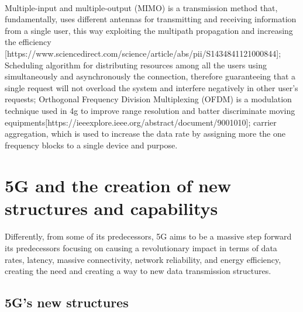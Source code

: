 \documentclass[10pt,journal,compsoc]{IEEEtran}
\begin{document}
\paragraph{}
Multiple-input and multiple-output (MIMO) is a transmission method that, fundamentally, uses different antennas for transmitting and receiving information from a single user, this way exploiting the multipath propagation and increasing the efficiency [https://www.sciencedirect.com/science/article/abs/pii/S1434841121000844]; Scheduling algorithm for distributing resources among all the users using simultaneously and asynchronously the connection, therefore guaranteeing that a single request will not overload the system and interfere negatively in other user's requests; Orthogonal Frequency Division Multiplexing (OFDM) is a modulation technique used in 4g to improve range resolution and batter discriminate moving equipments[https://ieeexplore.ieee.org/abstract/document/9001010]; carrier aggregation, which is used to increase the data rate by assigning more the one frequency blocks to a single device and purpose.


\section{5G and the creation of new structures and capabilitys}
\paragraph{}
Differently, from some of its predecessors, 5G aims to be a massive step forward its predecessors focusing on causing a revolutionary impact in terms of data rates, latency, massive connectivity, network reliability, and energy efficiency, creating the need and creating a way to new data transmission structures.\par
\subsection*{5G's new structures}
\end{document}
